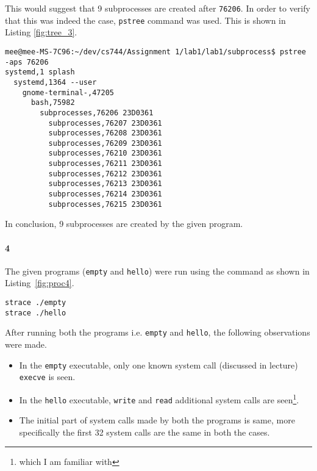 \documentclass[final,5p,times,authoryear]{elsarticle}
\begin{document}
This would suggest that 9 subprocesses are created after {\tt 76206}. In order to verify that this was indeed the case, {\tt pstree} command was used. This is shown in Listing \ref{fig:tree_3}.

\begin{lstlisting}[captionpos=b, caption={Snippet showing process tree for PID {\tt 76206}.},label={fig:tree_3},style=codeBash]
mee@mee-MS-7C96:~/dev/cs744/Assignment 1/lab1/lab1/subprocess$ pstree -aps 76206
systemd,1 splash
  systemd,1364 --user
    gnome-terminal-,47205
      bash,75982
        subprocesses,76206 23D0361
          subprocesses,76207 23D0361
          subprocesses,76208 23D0361
          subprocesses,76209 23D0361
          subprocesses,76210 23D0361
          subprocesses,76211 23D0361
          subprocesses,76212 23D0361
          subprocesses,76213 23D0361
          subprocesses,76214 23D0361
          subprocesses,76215 23D0361
\end{lstlisting}

In conclusion, 9 subprocesses are created by the given program.

\pagebreak

\paragraph{\bf 4}
The given programs ({\tt empty} and {\tt hello}) were run using the command as shown in Listing~\ref{fig:proc4}.

\begin{lstlisting}[captionpos=b, caption={Snippet showing the command used to investigate the given executables.},label={fig:proc4},style=codeBash]
strace ./empty
strace ./hello
\end{lstlisting}

After running both the programs i.e. {\tt empty} and {\tt hello}, the following observations were made. 

\begin{itemize}
  \item In the {\tt empty} executable, only one known system call (discussed in lecture) {\tt execve} is seen.
  \item In the {\tt hello} executable, {\tt write} and {\tt read} additional system calls are seen\footnote{which I am familiar with}.
  \item The initial part of system calls made by both the programs is same, more specifically the first 32 system calls are the same in both the cases.
\end{itemize}
\end{document}
